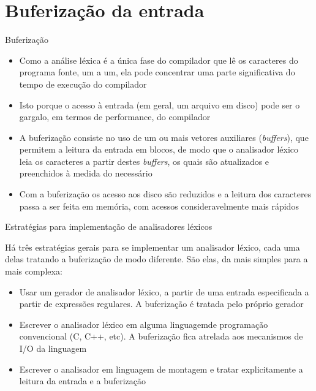 \section{Buferização da entrada}

\begin{frame}[fragile]{Buferização}

    \begin{itemize}
        \item Como a análise léxica é a única fase do compilador que lê os caracteres do programa fonte, um a um, ela pode concentrar uma parte significativa
            do tempo de execução do compilador
        \pause

        \item Isto porque o acesso à entrada (em geral, um arquivo em disco) pode ser o gargalo, em termos de performance, do compilador
        \pause

        \item A buferização consiste no uso de um ou mais vetores auxiliares (\textit{buffers}), que permitem a leitura da entrada em blocos, de modo que o analisador léxico
            leia os caracteres a partir destes \textit{buffers}, os quais são atualizados e preenchidos à medida do necessário
        \pause

        \item Com a buferização os acesso aos disco são reduzidos e a leitura dos caracteres passa a ser feita em memória, com acessos consideravelmente mais
            rápidos
    \end{itemize}

\end{frame}
\begin{frame}[fragile]{Estratégias para implementação de analisadores léxicos}

    Há três estratégias gerais para se implementar um analisador léxico, cada uma delas tratando a buferização de modo diferente. São elas, da mais
    simples para a mais complexa:
    \pause
    \begin{itemize}
        \item Usar um gerador de analisador léxico, a partir de uma entrada especificada a partir de expressões regulares. A buferização é tratada pelo próprio
            gerador
        \pause

        \item Escrever o analisador léxico em alguma linguagemde programação convencional (C, C++, etc). A buferização fica atrelada aos mecanismos de I/O da
            linguagem
        \pause

        \item Escrever o analisador em linguagem de montagem e tratar explicitamente a leitura da entrada e a buferização
    \end{itemize}

\end{frame}

